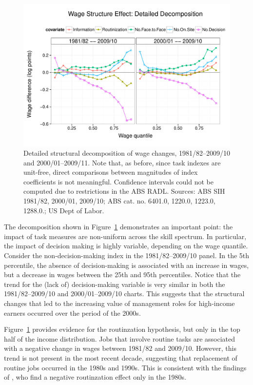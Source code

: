 \begin{figure}[th]
  \centering
  \includegraphics[width=\textwidth]{../figure/structure_decomp.pdf}
  \caption{Detailed structural decomposition of wage changes, 1981/82--2009/10 and 2000/01--2009/11. Note that, as before, since task indexes are unit-free, direct comparisons between magnitudes of index coefficients is not meaningful. Confidence intervals could not be computed due to restrictions in the ABS RADL. Sources: ABS SIH 1981/82, 2000/01, 2009/10; ABS cat. no. 6401.0, 1220.0, 1223.0, 1288.0.; US Dept of Labor.}
  \label{fig:structure}
\end{figure}

The decomposition shown in Figure~\ref{fig:structure} demonstrates an important point: the impact of task measures are non-uniform across the skill spectrum. In particular, the impact of decision making is highly variable, depending on the wage quantile. Consider the non-decision-making index in the 1981/82--2009/10 panel. In the 5th percentile, the absence of decision-making is associated with an increase in wages, but a decrease in wages between the 25th and 95th percentiles. Notice that the trend for the (lack of) decision-making variable is very similar in both the 1981/82--2009/10 and 2000/01--2009/10 charts. This suggests that the structural changes that led to the increasing value of management roles for high-income earners occurred over the period of the 2000s.

Figure~\ref{fig:structure} provides evidence for the routinzation hypothesis, but only in the top half of the income distribution. Jobs that involve routine tasks are associated with a negative change in wages between 1981/82 and 2009/10. However, this trend is not present in the most recent decade, suggesting that replacement of routine jobs occurred in the 1980s and 1990s. This is consistent with the findings of \citet{Firpo2011}, who find a negative routinzation effect only in the 1980s.

